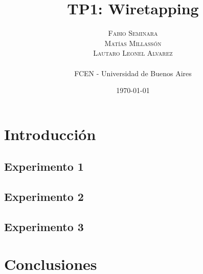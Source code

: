 \documentclass[twoside,twocolumn]{article}
\title{TP1: Wiretapping} %
\author{
\textsc{Fabio Seminara} \\
\textsc{Matías Millassón} \\
\textsc{Lautaro Leonel Alvarez} \\
\\
\normalsize FCEN - Universidad de Buenos Aires
}
\date{\today} %
\begin{document}
\maketitle


%

\section{Introducci\'on}


\subsection{Experimento 1}

\subsection{Experimento 2}

\subsection{Experimento 3}


\section{Conclusiones}

\end{document}
